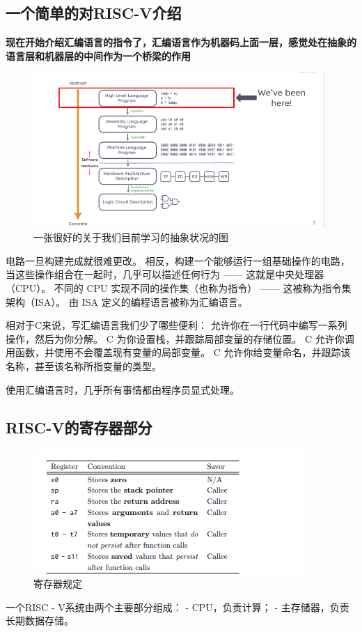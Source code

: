 \documentclass{ctexart}
\begin{document}
\subsection{一个简单的对RISC-V介绍}
\textbf{现在开始介绍汇编语言的指令了，汇编语言作为机器码上面一层，感觉处在抽象的语言层和机器层的中间作为一个桥梁的作用}
\begin{figure}
    \centering
    \includegraphics[width=0.5\linewidth]{目前的抽象.png}
    \caption{一张很好的关于我们目前学习的抽象状况的图}
    \label{fig:enter-label}
\end{figure}
电路一旦构建完成就很难更改。
相反，构建一个能够运行一组基础操作的电路，当这些操作组合在一起时，几乎可以描述任何行为 —— 这就是中央处理器（CPU）。
不同的 CPU 实现不同的操作集（也称为指令） —— 这被称为指令集架构（ISA）。
由 ISA 定义的编程语言被称为汇编语言。\par
相对于C来说，写汇编语言我们少了哪些便利： 允许你在一行代码中编写一系列操作，然后为你分解。
C 为你设置栈，并跟踪局部变量的存储位置。
C 允许你调用函数，并使用不会覆盖现有变量的局部变量。
C 允许你给变量命名，并跟踪该名称，甚至该名称所指变量的类型。\par
使用汇编语言时，几乎所有事情都由程序员显式处理。
\subsection{RISC-V的寄存器部分}

\begin{figure}
    \centering
    \includegraphics[width=0.5\linewidth]{寄存器规定.png}
    \caption{寄存器规定}
    \label{fig:enter-label}
\end{figure}


一个RISC - V系统由两个主要部分组成：  
- CPU，负责计算；  
- 主存储器，负责长期数据存储。  \par
\end{document}
